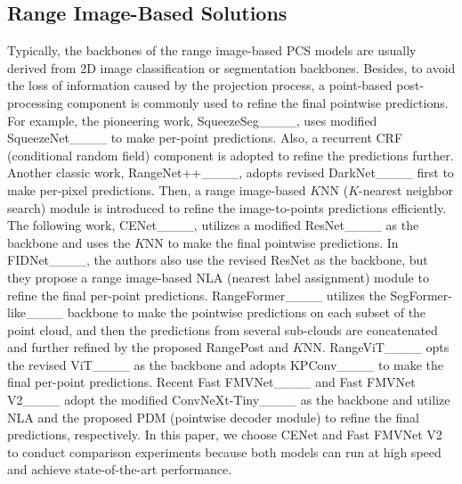 \subsection{Range Image-Based Solutions}
Typically, the backbones of the range image-based PCS models are usually derived from 2D image classification or segmentation backbones. Besides, to avoid the loss of information caused by the projection process, a point-based post-processing component is commonly used to refine the final pointwise predictions. For example, the pioneering work, SqueezeSeg____, uses modified SqueezeNet____ to make per-point predictions. Also, a recurrent CRF (conditional random field) component is adopted to refine the predictions further. Another classic work, RangeNet++____, adopts revised DarkNet____ first to make per-pixel predictions. Then, a range image-based $K$NN ($K$-nearest neighbor search) module is introduced to refine the image-to-points predictions efficiently. The following work, CENet____, utilizes a modified ResNet____ as the backbone and uses the $K$NN to make the final pointwise predictions. In FIDNet____, the authors also use the revised ResNet as the backbone, but they propose a range image-based NLA (nearest label assignment) module to refine the final per-point predictions. RangeFormer____ utilizes the SegFormer-like____ backbone to make the pointwise predictions on each subset of the point cloud, and then the predictions from several sub-clouds are concatenated and further refined by the proposed RangePost and $K$NN. RangeViT____ opts the revised ViT____ as the backbone and adopts KPConv____ to make the final per-point predictions. Recent Fast FMVNet____ and Fast FMVNet V2____ adopt the modified ConvNeXt-Tiny____ as the backbone and utilize NLA and the proposed PDM (pointwise decoder module) to refine the final predictions, respectively. In this paper, we choose CENet and Fast FMVNet V2 to conduct comparison experiments because both models can run at high speed and achieve state-of-the-art performance.
   


